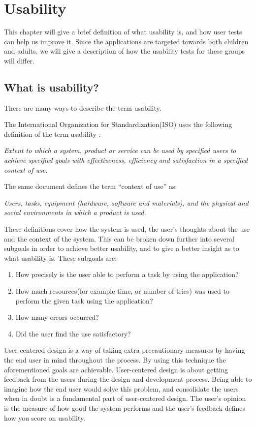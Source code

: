 \chapter{Usability}
\label{chp:usability}

This chapter will give a brief definition of what usability is, and how user tests can help us improve it. Since the applications are targeted towards both children and adults, we will give a description of how the usability tests for these groups will differ.

\section{What is usability?}
\label{sec:usability}
There are many ways to describe the term usability. 

The International Organization for Standardization(ISO) uses the following definition of the term usability \cite{isousability}:

\textit{Extent to which a system, product or service can be used by specified
users to achieve specified goals with effectiveness, efficiency
and satisfaction in a specified context of use.}

The same document defines the term ``context of use'' as:

\textit{Users, tasks, equipment (hardware, software and materials), and
the physical and social environments in which a product is used.}

These definitions cover how the system is used, the user's thoughts about the use and the context of the system. This can be broken down further into several subgoals in order to achieve better usability, and to give a better insight as to what usability is. 
These subgoals are:

\begin{enumerate}
\item{How precisely is the user able to perform a task by using the application?}
\item{How much resources(for example time, or number of tries) was used to perform the given task using the application?}
\item{How many errors occurred?}
\item{Did the user find the use satisfactory?}
\end{enumerate}

User-centered design is a way of taking extra precautionary measures by having the end user in mind throughout the process. By using this technique the aforementioned goals are achievable. User-centered design is about getting feedback from the users during the design and development process. Being able to imagine how the end user would solve this problem, and consolidate the users when in doubt is a fundamental part of user-centered design. The user's opinion is the measure of how good the system performs and the user's feedback defines how you score on usability.

